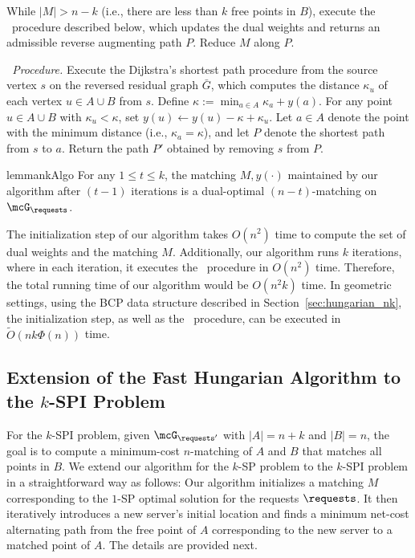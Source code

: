 While $|M|>n-k$ (i.e., there are less than $k$ free points in $B$), execute the \reverse\ procedure described below, which updates the dual weights and returns an admissible reverse augmenting path $P$. Reduce $M$ along $P$. 

{\it \reverse\ Procedure.} Execute the Dijkstra's shortest path procedure from the source vertex $s$ on the reversed residual graph $\bar{G}$, which computes the distance $\kappa_u$ of each vertex $u\in A\cup B$ from $s$. Define $\kappa:=\min_{a\in A} \kappa_a + y(a)$. For any point $u\in A\cup B$ with $\kappa_u<\kappa$, set $y(u)\leftarrow y(u)-\kappa+\kappa_u$. Let $a\in A$ denote the point with the minimum distance (i.e., $\kappa_a=\kappa$), and let $P$ denote the shortest path from $s$ to $a$. Return the path $P'$ obtained by removing $s$ from $P$.




\begin{restatable}{lemma}{nkAlgo}\label{lemma:nkAlgo}
    For any $1\le t\le k$, the matching $M, y(\cdot)$ maintained by our algorithm after $(t-1)$ iterations is a dual-optimal $(n-t)$-matching on $\mcG_\requests$.
\end{restatable}


The initialization step of our algorithm takes $O(n^2)$ time to compute the set of dual weights and the matching $M$. Additionally, our algorithm runs $k$ iterations, where in each iteration, it executes the \reverse\ procedure in $O(n^2)$ time. Therefore, the total running time of our algorithm would be $O(n^2k)$ time. In geometric settings, using the BCP data structure described in Section~\ref{sec:hungarian_nk}, the initialization step, as well as the \reverse\ procedure, can be executed in $\tilde{O}(nk\Phi(n))$ time.


\subsection{Extension of the Fast Hungarian Algorithm to the \texorpdfstring{$k$}{}-SPI Problem} 
For the $k$-SPI problem, given $\mcG_{\requests'}$ with $|A|=n+k$ and $|B|=n$, the goal is to compute a minimum-cost $n$-matching of $A$ and $B$ that matches all points in $B$. We extend our algorithm for the $k$-SP problem to the $k$-SPI problem in a straightforward way as follows: Our algorithm initializes a matching $M$ corresponding to the $1$-SP optimal solution for the requests $\requests$. It then iteratively introduces a new server's initial location and finds a minimum net-cost alternating path from the free point of $A$ corresponding to the new server to a matched point of $A$. The details are provided next.

